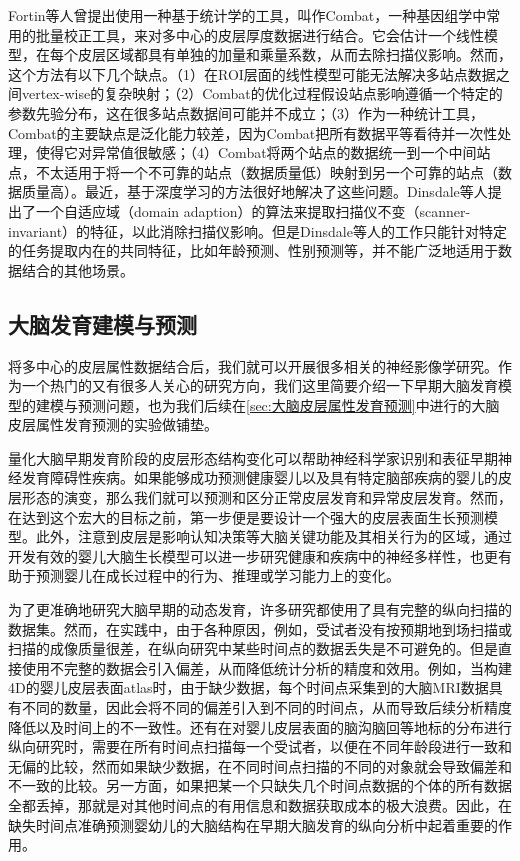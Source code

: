 Fortin等人\cite{fortin2018harmonization}曾提出使用一种基于统计学的工具，叫作Combat，一种基因组学中常用的批量校正工具，来对多中心的皮层厚度数据进行结合。它会估计一个线性模型，在每个皮层区域都具有单独的加量和乘量系数，从而去除扫描仪影响。然而，这个方法有以下几个缺点。（1）在ROI层面的线性模型可能无法解决多站点数据之间vertex-wise的复杂映射；（2）Combat的优化过程假设站点影响遵循一个特定的参数先验分布，这在很多站点数据间可能并不成立；（3）作为一种统计工具，Combat的主要缺点是泛化能力较差，因为Combat把所有数据平等看待并一次性处理，使得它对异常值很敏感；（4）Combat将两个站点的数据统一到一个中间站点，不太适用于将一个不可靠的站点（数据质量低）映射到另一个可靠的站点（数据质量高）。最近，基于深度学习的方法很好地解决了这些问题。Dinsdale\cite{dinsdale2020unlearning}等人提出了一个自适应域（domain adaption）的算法来提取扫描仪不变（scanner-invariant）的特征，以此消除扫描仪影响。但是Dinsdale等人\cite{dinsdale2020unlearning}的工作只能针对特定的任务提取内在的共同特征，比如年龄预测、性别预测等，并不能广泛地适用于数据结合的其他场景。

\subsection{大脑发育建模与预测}
将多中心的皮层属性数据结合后，我们就可以开展很多相关的神经影像学研究。作为一个热门的又有很多人关心的研究方向，我们这里简要介绍一下早期大脑发育模型的建模与预测问题，也为我们后续在\ref{sec:大脑皮层属性发育预测}中进行的大脑皮层属性发育预测的实验做铺垫。

量化大脑早期发育阶段的皮层形态结构变化可以帮助神经科学家识别和表征早期神经发育障碍性疾病。如果能够成功预测健康婴儿以及具有特定脑部疾病的婴儿的皮层形态的演变，那么我们就可以预测和区分正常皮层发育和异常皮层发育。然而，在达到这个宏大的目标之前，第一步便是要设计一个强大的皮层表面生长预测模型。此外，注意到皮层是影响认知决策等大脑关键功能及其相关行为的区域，通过开发有效的婴儿大脑生长模型可以进一步研究健康和疾病中的神经多样性，也更有助于预测婴儿在成长过程中的行为、推理或学习能力上的变化\cite{gilmore2007regional}。

为了更准确地研究大脑早期的动态发育，许多研究都使用了具有完整的纵向扫描的数据集。然而，在实践中，由于各种原因，例如，受试者没有按预期地到场扫描或扫描的成像质量很差，在纵向研究中某些时间点的数据丢失是不可避免的。但是直接使用不完整的数据会引入偏差，从而降低统计分析的精度和效用。例如，当构建4D的婴儿皮层表面atlas时，由于缺少数据，每个时间点采集到的大脑MRI数据具有不同的数量\cite{wu2019construction}，因此会将不同的偏差引入到不同的时间点，从而导致后续分析精度降低以及时间上的不一致性。还有在对婴儿皮层表面的脑沟脑回等地标的分布进行纵向研究时\cite{duan2019exploring}，需要在所有时间点扫描每一个受试者，以便在不同年龄段进行一致和无偏的比较，然而如果缺少数据，在不同时间点扫描的不同的对象就会导致偏差和不一致的比较。另一方面，如果把某一个只缺失几个时间点数据的个体的所有数据全都丢掉，那就是对其他时间点的有用信息和数据获取成本的极大浪费。因此，在缺失时间点准确预测婴幼儿的大脑结构在早期大脑发育的纵向分析中起着重要的作用\cite{meng2017can}。

